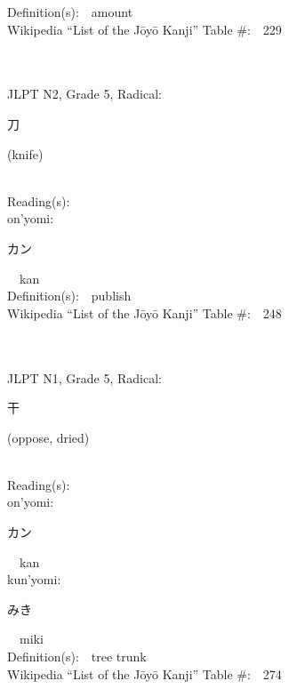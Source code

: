 \begin{multicols}{2}
Definition(s):\ \ amount \\
Wikipedia ``List of the J\=oy\=o Kanji'' Table \#:\ \ 229 \\
\ \ \\
{\fontsize{34pt}{40pt}  }\ \ \\  %
{JLPT N2, Grade 5, Radical:\ \ {\begin{CJK}{UTF8}{min} 刀 \end{CJK}} (knife) } \\
Reading(s):\ \ \\
{\hspace*{1em}}on'yomi:\ \ \\
{\hspace*{2em}}{\begin{CJK}{UTF8}{min} カン \end{CJK}}\ \ kan\ \ \\
Definition(s):\ \ publish \\
Wikipedia ``List of the J\=oy\=o Kanji'' Table \#:\ \ 248 \\
\ \ \\
{\fontsize{34pt}{40pt}  }\ \ \\  %
{JLPT N1, Grade 5, Radical:\ \ {\begin{CJK}{UTF8}{min} 干 \end{CJK}} (oppose, dried) } \\
Reading(s):\ \ \\
{\hspace*{1em}}on'yomi:\ \ \\
{\hspace*{2em}}{\begin{CJK}{UTF8}{min} カン \end{CJK}}\ \ kan\ \ \\
{\hspace*{1em}}kun'yomi:\ \ \\
{\hspace*{2em}}{\begin{CJK}{UTF8}{min} みき \end{CJK}}\ \ miki\ \ \\
Definition(s):\ \ tree trunk \\
Wikipedia ``List of the J\=oy\=o Kanji'' Table \#:\ \ 274 \\

\end{multicols}
